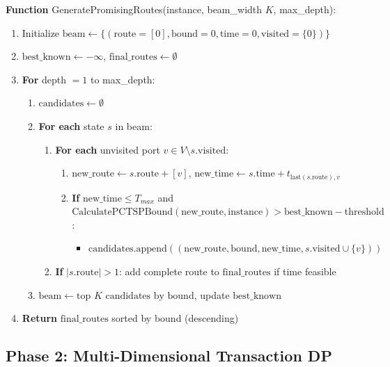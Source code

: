 \documentclass[12pt]{article}
\begin{document}
\textbf{Function} GeneratePromisingRoutes(instance, beam\_width $K$, max\_depth):
\begin{enumerate}
    \item Initialize $\text{beam} \gets \{(\text{route}=[0], \text{bound}=0, \text{time}=0, \text{visited}=\{0\})\}$
    \item $\text{best\_known} \gets -\infty$, $\text{final\_routes} \gets \emptyset$
    \item \textbf{For} depth $= 1$ to max\_depth:
    \begin{enumerate}
        \item $\text{candidates} \gets \emptyset$
        \item \textbf{For each} state $s$ in beam:
        \begin{enumerate}
            \item \textbf{For each} unvisited port $v \in V \setminus s.\text{visited}$:
            \begin{enumerate}
                \item $\text{new\_route} \gets s.\text{route} + [v]$, $\text{new\_time} \gets s.\text{time} + t_{\text{last}(s.\text{route}), v}$
                \item \textbf{If} $\text{new\_time} \leq T_{max}$ and $\text{CalculatePCTSPBound}(\text{new\_route}, \text{instance}) > \text{best\_known} - \text{threshold}$:
                \begin{itemize}
                    \item $\text{candidates}.\text{append}((\text{new\_route}, \text{bound}, \text{new\_time}, s.\text{visited} \cup \{v\}))$
                \end{itemize}
            \end{enumerate}
            \item \textbf{If} $|s.\text{route}| > 1$: add complete route to $\text{final\_routes}$ if time feasible
        \end{enumerate}
        \item $\text{beam} \gets \text{top } K \text{ candidates by bound}$, update $\text{best\_known}$
    \end{enumerate}
    \item \textbf{Return} $\text{final\_routes}$ sorted by bound (descending)
\end{enumerate}

\subsection{Phase 2: Multi-Dimensional Transaction DP}
\end{document}

